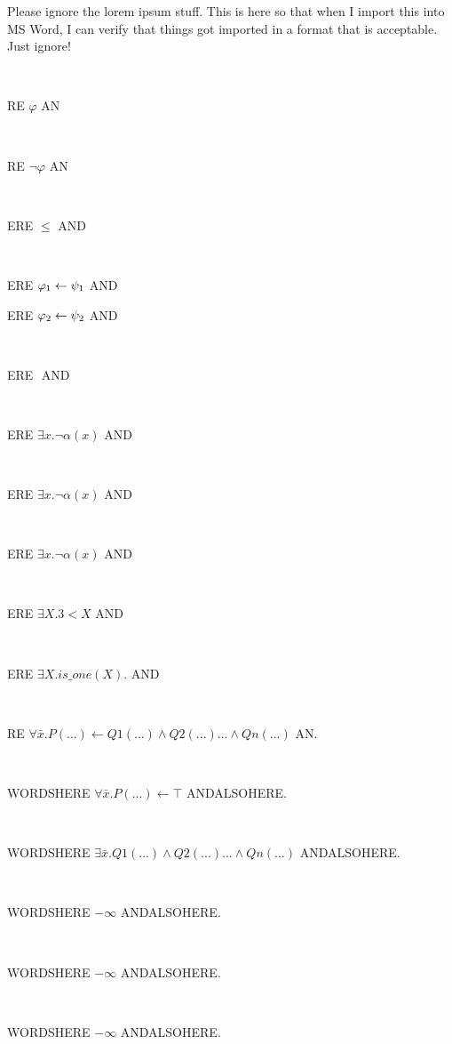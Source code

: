 \documentclass[12pt]{article}
\begin{document}
Please ignore the lorem ipsum stuff. This is here so that when I import this into MS Word, I can verify that things got imported in a format that is acceptable.  Just ignore!

\centerline{~}

RE $ \varphi   $ AN

\centerline{~}

RE $ \neg \varphi   $ AN

\centerline{~}

ERE $ \leq   $ AND

\centerline{~}

ERE $ \varphi_{\scriptsize 1} \leftarrow \psi_{\scriptsize 1}   $ AND

ERE $ \varphi_{\scriptsize 2} \leftarrow \psi_{\scriptsize 2}   $ AND

\centerline{~}

ERE $    $ AND

\centerline{~}

ERE $ \exists x. \neg \alpha(x)   $ AND

\centerline{~}

ERE $ \exists x. \neg \alpha(x)   $ AND


\centerline{~}

ERE $ \exists x. \neg \alpha(x)   $ AND

\centerline{~}

ERE $ \exists X. 3 < X  $ AND

\centerline{~}

ERE $ \exists X. is\_one(X).  $ AND

\centerline{~}

RE $ \forall \bar{x}. P(...) \leftarrow Q1(...) \wedge Q2(...) ... \wedge Qn(...) $ AN.

\centerline{~}

WORDSHERE $ \forall \bar{x}. P(...) \leftarrow \top  $ ANDALSOHERE.

\centerline{~}

WORDSHERE $ \exists \bar{x}.  Q1(...) \wedge Q2(...) ... \wedge Qn(...)  $ ANDALSOHERE.

\centerline{~}

WORDSHERE $ - \infty $ ANDALSOHERE.

\centerline{~}

WORDSHERE $ - \infty $ ANDALSOHERE.

\centerline{~}

WORDSHERE $ - \infty $ ANDALSOHERE.
\end{document}
